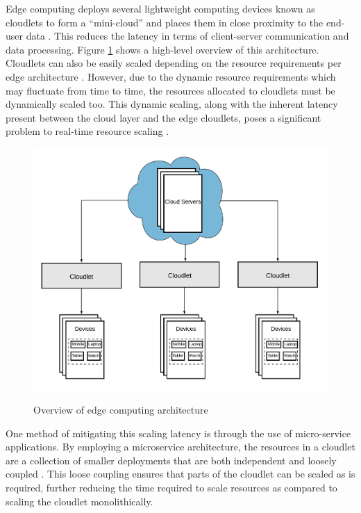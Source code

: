 Edge computing deploys several lightweight computing devices known as cloudlets to form a ``mini-cloud'' and places them in close proximity to the end-user data \cite{liu2019survey}. This reduces the latency in terms of client-server communication and data processing. Figure \ref{fig:edge-architecture-overview} shows a high-level overview of this architecture. Cloudlets can also be easily scaled depending on the resource requirements per edge architecture \cite{ren2019survey}. However, due to the dynamic resource requirements which may fluctuate from time to time, the resources allocated to cloudlets must be dynamically scaled too. This dynamic scaling, along with the inherent latency present between the cloud layer and the edge cloudlets, poses a significant problem to real-time resource scaling \cite{varghese2016challenges}.\par

\begin{figure}[htb]
    \centering
    \caption{Overview of edge computing architecture}
    \includegraphics[width=0.9\linewidth]{Figures/Edge-Architecture-Overview.png}
    \label{fig:edge-architecture-overview}
\end{figure}

One method of mitigating this scaling latency is through the use of micro-service applications. By employing a microservice architecture, the resources in a cloudlet are a collection of smaller deployments that are both independent and loosely coupled \cite{villamizar2015evaluating}. This loose coupling ensures that parts of the cloudlet can be scaled as is required, further reducing the time required to scale resources as compared to scaling the cloudlet monolithically.\par

